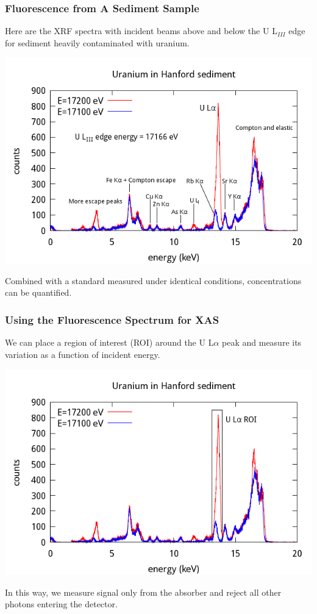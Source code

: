 \documentclass[10pt, xcolor=x11names, compress]{beamer}
\begin{document}
\begin{frame}
  \frametitle{Fluorescence from A Sediment Sample}
  \begin{center}
    Here are the XRF spectra with incident beams \alert{above} and
    {\color{Blue4}below} the U L$_{III}$ edge for sediment heavily
    contaminated with uranium.

    \includegraphics[width=0.7\linewidth]{xrf/xrf.png}
  \end{center}

  \begin{exampleblock}{}
    \begin{center}
      Combined with a standard measured under identical conditions,
      concentrations can be quantified.
    \end{center}
  \end{exampleblock}
\end{frame}
\begin{frame}
  \frametitle{Using the Fluorescence Spectrum for XAS}
  \begin{center}
    We can place a \alert{region of interest} (ROI) around the U
    L$\alpha$ peak and measure its variation as a function of incident
    energy.

    \includegraphics[width=0.7\linewidth]{xrf/roi.png}
  \end{center}

  \begin{exampleblock}{}
    \begin{center}
      In this way, we measure signal only from the absorber and reject
      all other photons entering the detector.
    \end{center}
  \end{exampleblock}
\end{frame}
\end{document}
